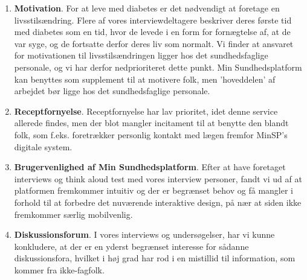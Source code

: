 \begin{enumerate}
	\item \textbf{Motivation}. For at leve med diabetes er det nødvendigt at foretage en livsstilsændring. Flere af vores interviewdeltagere beskriver deres første tid med diabetes som en tid, hvor de levede i en form for fornægtelse af, at de var syge, og de fortsatte derfor deres liv som normalt. 
	Vi finder at ansvaret for motivationen til livsstilsændringen ligger hos det sundhedsfaglige personale, og vi har derfor nedprioriteret dette punkt. Min Sundhedsplatform kan benyttes som supplement til at motivere folk, men 'hoveddelen' af arbejdet bør ligge hos det sundhedsfaglige personale.
	\item \textbf{Receptfornyelse}. Receptfornyelse har lav prioritet, idet denne service allerede findes, men der blot mangler incitament til at benytte den blandt folk, som f.eks. foretrækker personlig kontakt med lægen fremfor MinSP's digitale system.
	\item \textbf{Brugervenlighed af Min Sundhedsplatform}. Efter at have foretaget interviews og think aloud test med vores interview personer, fandt vi ud af at platformen fremkommer intuitiv og der er begrænset behov og få mangler i forhold til at forbedre det nuværende interaktive design, på nær at siden ikke fremkommer særlig mobilvenlig.
	\item \textbf{Diskussionsforum}. I vores interviews og undersøgelser, har vi kunne konkludere, at der er en yderst begrænset interesse for sådanne diskussionsfora, hvilket i høj grad har rod i en mistillid til information, som kommer fra ikke-fagfolk.
\end{enumerate}
